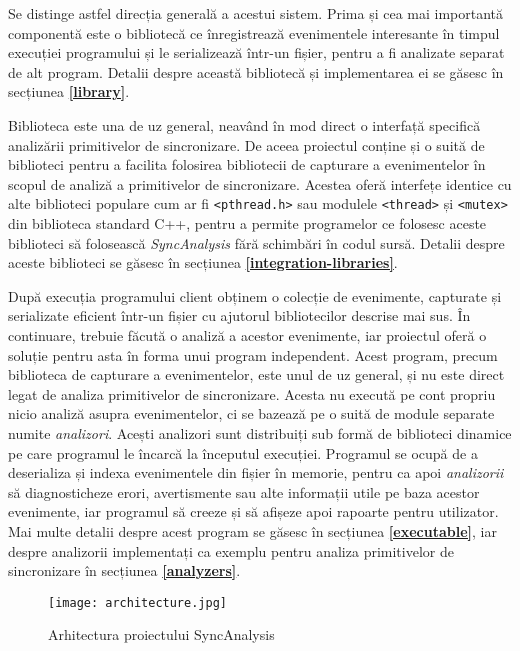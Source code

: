 Se distinge astfel direcția generală a acestui sistem. Prima și cea mai
importantă componentă este o bibliotecă ce înregistrează evenimentele
interesante în timpul execuției programului și le serializează într-un
fișier, pentru a fi analizate separat de alt program. Detalii despre
această bibliotecă și implementarea ei se găsesc în secțiunea
\textbf{\ref{library}}.

Biblioteca este una de uz general, neavând în mod direct o interfață
specifică analizării primitivelor de sincronizare. De aceea proiectul
conține și o suită de biblioteci pentru a facilita folosirea bibliotecii
de capturare a evenimentelor în scopul de analiză a primitivelor de
sincronizare. Acestea oferă interfețe identice cu alte biblioteci
populare cum ar fi \lstinline{<pthread.h>} sau modulele
\lstinline{<thread>} și \lstinline{<mutex>} din biblioteca standard C++,
pentru a permite programelor ce folosesc aceste biblioteci să folosească
\textit{SyncAnalysis} fără schimbări în codul sursă. Detalii despre
aceste biblioteci se găsesc în secțiunea
\textbf{\ref{integration-libraries}}.

După execuția programului client obținem o colecție de evenimente,
capturate și serializate eficient într-un fișier cu ajutorul
bibliotecilor descrise mai sus. În continuare, trebuie făcută o analiză
a acestor evenimente, iar proiectul oferă o soluție pentru asta în forma
unui program independent. Acest program, precum biblioteca de capturare
a evenimentelor, este unul de uz general, și nu este direct legat de
analiza primitivelor de sincronizare. Acesta nu execută pe cont propriu
nicio analiză asupra evenimentelor, ci se bazează pe o suită de module
separate numite \textit{analizori}. Acești analizori sunt distribuiți
sub formă de biblioteci dinamice pe care programul le încarcă la
începutul execuției. Programul se ocupă de a deserializa și indexa
evenimentele din fișier în memorie, pentru ca apoi \textit{analizorii}
să diagnosticheze erori, avertismente sau alte informații utile pe baza
acestor evenimente, iar programul să creeze și să afișeze apoi rapoarte
pentru utilizator. Mai multe detalii despre acest program se găsesc în
secțiunea \textbf{\ref{executable}}, iar despre analizorii implementați
ca exemplu pentru analiza primitivelor de sincronizare în secțiunea
\textbf{\ref{analyzers}}.

\begin{figure}[h]
\centering
\texttt{[image: architecture.jpg]}
\caption{Arhitectura proiectului SyncAnalysis}
\label{fig:architecture}
\end{figure}

